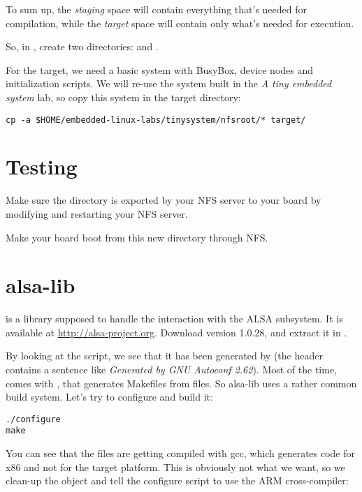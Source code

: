 To sum up, the {\em staging} space will contain everything that's
needed for compilation, while the {\em target} space will contain only
what's needed for execution.

So, in , create two
directories:  and .

For the target, we need a basic system with BusyBox, device nodes and
initialization scripts. We will re-use the system built in the {\em A
  tiny embedded system} lab, so copy this system in the target
directory:

\begin{verbatim}
cp -a $HOME/embedded-linux-labs/tinysystem/nfsroot/* target/
\end{verbatim}

\section{Testing}

Make sure the  directory is exported by your NFS server
to your board by modifying  and restarting your NFS
server.

Make your board boot from this new directory through NFS.

\section{alsa-lib}

 is a library supposed to handle the interaction with
the ALSA subsystem. It is available at
\url{http://alsa-project.org}. Download version 1.0.28, and extract it
in .

By looking at the  script, we see that it has
been generated by  (the header contains a
sentence like {\em Generated by GNU Autoconf 2.62}). Most of the time,
 comes with , that generates Makefiles
from  files. So alsa-lib uses a rather common build
system. Let's try to configure and build it:

\begin{verbatim}
./configure
make
\end{verbatim}

You can see that the files are getting compiled with gcc, which
generates code for x86 and not for the target platform. This is
obviously not what we want, so we clean-up the object and tell the
configure script to use the ARM cross-compiler:

